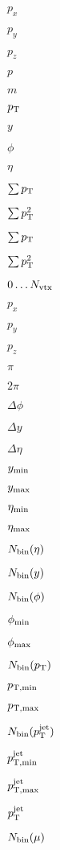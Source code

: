 \documentclass{article}
\begin{document}
$p_x$
\pagebreak

$p_y$
\pagebreak

$p_z$
\pagebreak

$p$
\pagebreak

$m$
\pagebreak

$p_{\rm T}$
\pagebreak

$y$
\pagebreak

$\phi$
\pagebreak

$\eta$
\pagebreak

$\sum{p_{\rm T}}$
\pagebreak

$\sum{p_{\rm T}^{2}}$
\pagebreak

$ \sum{p_{\rm T}} $
\pagebreak

$ \sum{p_{\rm T}^{2}} $
\pagebreak

$0\ldots N_{\rm vtx}$
\pagebreak

$p_{x}$
\pagebreak

$p_{y}$
\pagebreak

$p_{z}$
\pagebreak

$\pi$
\pagebreak

$2 \pi$
\pagebreak

$\Delta\phi$
\pagebreak

$\Delta y$
\pagebreak

$\Delta\eta$
\pagebreak

$y_{\rm min}$
\pagebreak

$y_{\rm max}$
\pagebreak

$\eta_{\rm min}$
\pagebreak

$\eta_{\rm max}$
\pagebreak

$N_{\rm bin}(\eta)$
\pagebreak

$N_{\rm bin}(y)$
\pagebreak

$N_{\rm bin}(\phi)$
\pagebreak

$\phi_{\rm min}$
\pagebreak

$\phi_{\rm max}$
\pagebreak

$N_{\rm bin}(p_{\rm T}) $
\pagebreak

$p_{\rm T,min}$
\pagebreak

$p_{\rm T,max}$
\pagebreak

$N_{\rm bin}(p_{\rm T}^{\rm jet})$
\pagebreak

$p_{\rm T,min}^{\rm jet}$
\pagebreak

$p_{\rm T,max}^{\rm jet}$
\pagebreak

$p_{\rm T}^{\rm jet}$
\pagebreak

$N_{\rm bin}(\mu)$
\pagebreak
\end{document}
